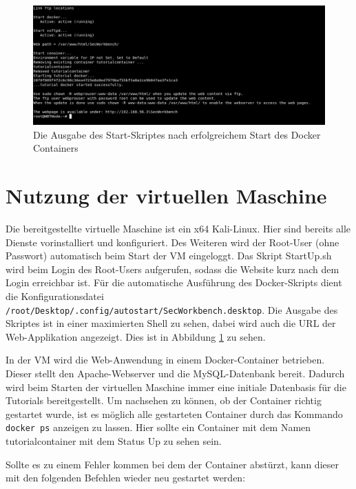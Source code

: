 \begin{figure}[H]
	\centering
	\includegraphics[width=\textwidth]{images/Installation/startUp.png}
	\caption{Die Ausgabe des Start-Skriptes nach erfolgreichem Start des Docker Containers}
	\label{fig:startUp}
\end{figure}

\section{Nutzung der virtuellen Maschine}

Die bereitgestellte virtuelle Maschine ist ein x64 Kali-Linux. Hier sind bereits alle Dienste vorinstalliert und konfiguriert. Des Weiteren wird der Root-User (ohne Passwort) automatisch beim Start der VM eingeloggt. Das Skript StartUp.sh wird beim Login des Root-Users aufgerufen, sodass die Website kurz nach dem Login erreichbar ist. Für die automatische Ausführung des Docker-Skripts dient die Konfigurationsdatei  \colorbox{altgray}{\lstinline|/root/Desktop/.config/autostart/SecWorkbench.desktop|}. Die Ausgabe des Skriptes ist in einer maximierten Shell zu sehen, dabei wird auch die URL der Web-Applikation angezeigt. Dies ist in Abbildung \ref{fig:startUp} zu sehen.\medskip

In der VM wird die Web-Anwendung in einem Docker-Container betrieben. Dieser stellt den Apache-Webserver und die MySQL-Datenbank bereit. Dadurch wird beim Starten der virtuellen Maschine immer eine initiale Datenbasis für die Tutorials bereitgestellt. Um nachsehen zu können, ob der Container richtig gestartet wurde, ist es möglich alle gestarteten Container durch das Kommando \colorbox{altgray}{\lstinline|docker ps|} anzeigen zu lassen. Hier sollte ein Container mit dem Namen tutorialcontainer mit dem Status Up zu sehen sein.\newpage

Sollte es zu einem Fehler kommen bei dem der Container abstürzt, kann dieser mit den folgenden Befehlen wieder neu gestartet werden:

